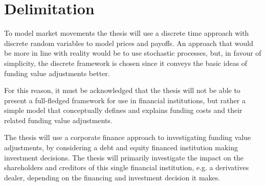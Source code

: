 \documentclass[main.tex]{subfiles}
\begin{document}
    \section{Delimitation}

    To model market movements the thesis will use a discrete time approach 
    with discrete random variables to model prices and payoffs.
    An approach that would be more in line with reality would be to use stochastic processes,
    but, in favour of simplicity, the discrete framework is chosen 
    since it conveys the basic ideas of funding value adjustments better.

    For this reason, it must be acknowledged that the thesis will not be able to
    present a full-fledged framework for use in financial institutions,
    but rather a simple model that conceptually defines and explains funding costs 
    and their related funding value adjustments.

    The thesis will use a corporate finance approach to investigating funding value adjustments,
    by considering a debt and equity financed institution making investment decisions.
    The thesis will primarily investigate the impact on the shareholders and creditors 
    of this single financial institution, e.g. a derivatives dealer,
    depending on the financing and investment decision it makes.
\end{document}
